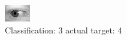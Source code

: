 \begin{figure}[h!]
\begin{center}
\includegraphics[width=0.60\columnwidth]{figures/ID696_class_3_target_4.png}
\end{center}
\caption{ Classification: 3 actual target: 4}
\label{fig:ID696_class_3_target_4}
\end{figure}
